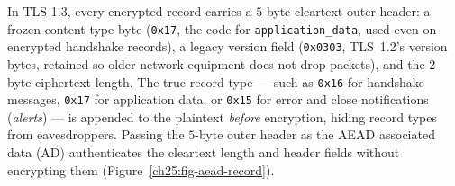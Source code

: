 In TLS 1.3, every encrypted record carries a $5$-byte cleartext outer header: a
frozen content-type byte (\texttt{0x17}, the code for \texttt{application\_data},
used even on encrypted handshake records), a legacy version field (\texttt{0x0303},
TLS~1.2's version bytes, retained so older network equipment does not drop packets),
and the $2$-byte ciphertext length. The true record type --- such as \texttt{0x16}
for handshake messages, \texttt{0x17} for application data, or \texttt{0x15} for
error and close notifications (\emph{alerts}) --- is appended to the plaintext
\emph{before} encryption, hiding record types from eavesdroppers. Passing the
$5$-byte outer header as the AEAD associated data ($\mathrm{AD}$) authenticates the
cleartext length and header fields without encrypting them
(Figure~\ref{ch25:fig-aead-record}).

